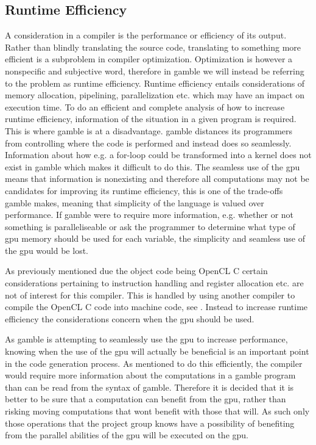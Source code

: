 \subsection*{Runtime Efficiency}\label{subsec:runtime}
A consideration in a compiler is the performance or efficiency of its output. 
Rather than blindly translating the source code, translating to something more efficient is a subproblem in compiler optimization.
Optimization is however a nonspecific and subjective word, therefore in \gls{gamble} we will instead be referring to the problem as runtime efficiency.
Runtime efficiency entails considerations of memory allocation, pipelining, parallelization etc. which may have an impact on execution time.
To do an efficient and complete analysis of how to increase runtime efficiency, information of the situation in a given program is required.
This is where \gls{gamble} is at a disadvantage. 
\gls{gamble} distances its programmers from controlling where the code is performed and instead does so seamlessly.
Information about how e.g. a for-loop could be transformed into a kernel does not exist in \gls{gamble} which makes it difficult to do this.
The seamless use of the \acrshort{gpu} means that information is nonexisting and therefore all computations may not be candidates for improving its runtime efficiency, this is one of the trade-offs \gls{gamble} makes, meaning that simplicity of the language is valued over performance.
If \gls{gamble} were to require more information, e.g. whether or not something is paralleliseable or ask the programmer to determine what type of \acrshort{gpu} memory should be used for each variable, the simplicity and seamless use of the \acrshort{gpu} would be lost.

As previously mentioned due the object code being OpenCL C certain considerations pertaining to instruction handling and register allocation etc. are not of interest for this compiler.
This is handled by using another compiler to compile the OpenCL C code into machine code, see . 
Instead to increase runtime efficiency the considerations concern when the \acrshort{gpu} should be used.

As \gls{gamble} is attempting to seamlessly use the \acrshort{gpu} to increase performance, knowing when the use of the \acrshort{gpu} will actually be beneficial is an important point in the code generation process.
As mentioned to do this efficiently, the compiler would require more information about the computations in a \gls{gamble} program than can be read from the syntax of \gls{gamble}.
Therefore it is decided that it is better to be sure that a computation can benefit from the \acrshort{gpu}, rather than risking moving computations that wont benefit with those that will.
As such only those operations that the project group knows have a possibility of benefiting from the parallel abilities of the \acrshort{gpu} will be executed on the \acrshort{gpu}.

